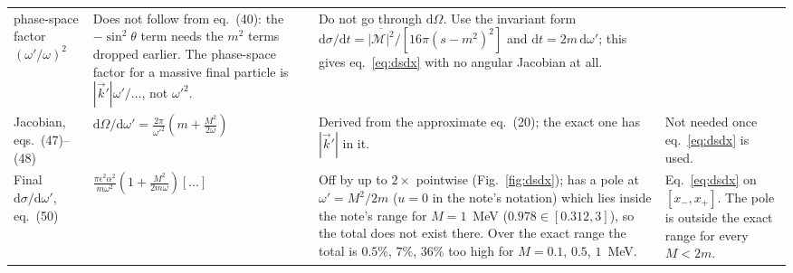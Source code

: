\documentclass[11pt,a4paper]{article}
\newcommand{\eps}{\epsilon}
\newcommand{\dd}{\mathrm{d}}
\begin{document}
{\begin{longtable}{@{}p{2.3cm}p{4.2cm}p{3.9cm}p{4.6cm}@{}}
phase-space factor $(\omega'/\omega)^2$ &
Does not follow from eq.~(40): the $-\sin^2\theta$ term needs the $m^2$ terms dropped earlier. The phase-space factor
for a massive final particle is $|\vec k'|\omega'/\ldots$, not $\omega'^2$. &
Do not go through $\dd\Omega$. Use the invariant form $\dd\sigma/\dd t=\overline{|\mathcal M|^2}/[16\pi(s-m^2)^2]$
and $\dd t=2m\,\dd\omega'$; this gives eq.~\eqref{eq:dsdx} with no angular Jacobian at all.\\
Jacobian, eqs.~(47)--(48) & $\dd\Omega/\dd\omega'=\frac{2\pi}{\omega'^2}(m+\frac{M^2}{2\omega})$ &
Derived from the approximate eq.~(20); the exact one has $|\vec k'|$ in it. & Not needed once eq.~\eqref{eq:dsdx} is used.\\
Final $\dd\sigma/\dd\omega'$, eq.~(50) & $\frac{\pi\eps^2\alpha^2}{m\omega^2}(1+\frac{M^2}{2m\omega})[\ldots]$ &
Off by up to $2\times$ pointwise (Fig.~\ref{fig:dsdx}); has a pole at $\omega'=M^2/2m$ ($u=0$ in the note's notation)
which lies inside the note's range for $M=1$~MeV ($0.978\in[0.312,3]$), so the total does not exist there. Over the
exact range the total is $0.5\%$, $7\%$, $36\%$ too high for $M=0.1$, $0.5$, $1$~MeV. &
Eq.~\eqref{eq:dsdx} on $[x_-,x_+]$. The pole is outside the exact range for every $M<2m$.\\
\bottomrule
\end{longtable}}
\end{document}
